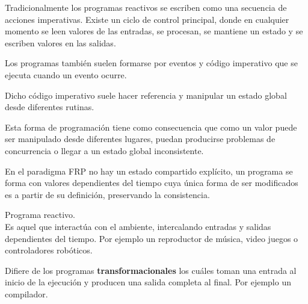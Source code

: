 
Tradicionalmente los programas reactivos
se escriben como una secuencia de acciones imperativas.
Existe un ciclo de control principal, donde en cualquier
momento se leen valores de las entradas, se procesan,
se mantiene un estado y se escriben valores en las salidas.

Los programas también suelen formarse por eventos
y código imperativo que se ejecuta cuando un evento ocurre.

Dicho código imperativo suele hacer referencia y manipular
un estado global desde diferentes rutinas.

Esta forma de programación tiene como consecuencia que
como un valor puede ser manipulado desde diferentes lugares,
puedan producirse problemas de concurrencia o llegar a un
estado global inconsistente.

En el paradigma FRP no hay un estado compartido explícito,
un programa se forma con valores dependientes del tiempo
cuya única forma de ser modificados
es a partir de su definición, preservando la consistencia.

\begin{definicion}
Programa reactivo.\\
Es aquel que interactúa con el ambiente, intercalando entradas
y salidas dependientes del tiempo. Por ejemplo un reproductor
de música, video juegos o controladores robóticos.

Difiere de los programas \textbf{transformacionales} los cuáles
toman una entrada al inicio de la ejecución y producen una salida
completa al final. Por ejemplo un compilador.
\end{definicion}

